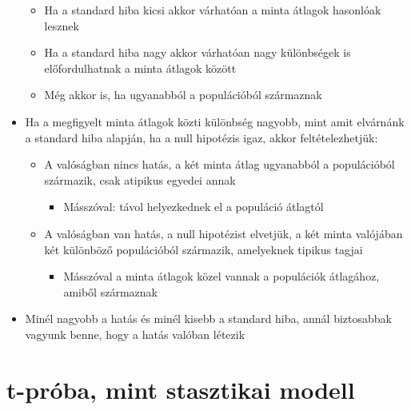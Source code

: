 \documentclass[
  letterpaper,
  DIV=11,
  numbers=noendperiod]{scrreprt}
\providecommand{\tightlist}{%
  \setlength{\itemsep}{0pt}\setlength{\parskip}{0pt}}\usepackage{longtable,booktabs,array}
\begin{document}
\begin{itemize}
  \begin{itemize}
  \item
    Ha a standard hiba kicsi akkor várhatóan a minta átlagok hasonlóak
    lesznek
  \item
    Ha a standard hiba nagy akkor várhatóan nagy különbségek is
    előfordulhatnak a minta átlagok között
  \item
    Még akkor is, ha ugyanabból a populációból származnak
  \end{itemize}
\item
  Ha a megfigyelt minta átlagok közti különbség nagyobb, mint amit
  elvárnánk a standard hiba alapján, ha a null hipotézis igaz, akkor
  feltételezhetjük:

  \begin{itemize}
  \item
    A valóságban nincs hatás, a két minta átlag ugyanabból a
    populációból származik, csak atipikus egyedei annak

    \begin{itemize}
    \tightlist
    \item
      Másszóval: távol helyezkednek el a populáció átlagtól
    \end{itemize}
  \item
    A valóságban van hatás, a null hipotézist elvetjük, a két minta
    valójában két különböző populációból származik, amelyeknek tipikus
    tagjai

    \begin{itemize}
    \tightlist
    \item
      Másszóval a minta átlagok közel vannak a populációk átlagához,
      amiből származnak
    \end{itemize}
  \end{itemize}
\item
  Minél nagyobb a hatás és minél kisebb a standard hiba, annál
  biztosabbak vagyunk benne, hogy a hatás valóban létezik
\end{itemize}

\hypertarget{t-pruxf3ba-mint-stasztikai-modell}{%
\section{t-próba, mint stasztikai
modell}\label{t-pruxf3ba-mint-stasztikai-modell}}
\end{document}

